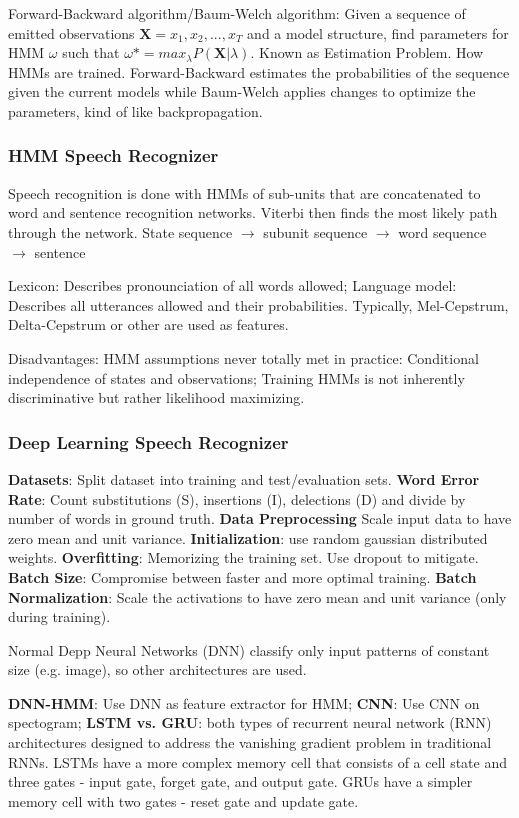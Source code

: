 Forward-Backward algorithm/Baum-Welch algorithm: Given a sequence of emitted observations $ \textbf{X} = x_1, x_2, ..., x_T $ and a model structure,
find parameters for HMM $ \omega $ such that $ \omega* = max_{\lambda} P(\textbf{X} | \lambda) $.
Known as Estimation Problem. How HMMs are trained.
Forward-Backward estimates the probabilities of the sequence given the current models while Baum-Welch applies changes to optimize the parameters,
kind of like backpropagation.

\subsubsection{HMM Speech Recognizer}
Speech recognition is done with HMMs of sub-units that are concatenated to word and sentence recognition networks.
Viterbi then finds the most likely path through the network.
State sequence $ \xrightarrow{} $ subunit sequence $ \xrightarrow{} $ word sequence $ \xrightarrow{} $ sentence

Lexicon: Describes pronounciation of all words allowed; Language model: Describes all utterances allowed and their probabilities.
Typically, Mel-Cepstrum, Delta-Cepstrum or other are used as features.

Disadvantages: HMM assumptions never totally met in practice: Conditional independence of states and observations;
Training HMMs is not inherently discriminative but rather likelihood maximizing.

\subsubsection{Deep Learning Speech Recognizer}
\textbf{Datasets}: Split dataset into training and test/evaluation sets.
\textbf{Word Error Rate}: Count substitutions (S), insertions (I), delections (D) and divide by number of words in ground truth.
\textbf{Data Preprocessing} Scale input data to have zero mean and unit variance.
\textbf{Initialization}: use random gaussian distributed weights.
\textbf{Overfitting}: Memorizing the training set. Use dropout to mitigate.
\textbf{Batch Size}: Compromise between faster and more optimal training.
\textbf{Batch Normalization}: Scale the activations to have zero mean and unit variance (only during training).

Normal Depp Neural Networks (DNN) classify only input patterns of constant size (e.g. image), so other architectures are used.

\textbf{DNN-HMM}: Use DNN as feature extractor for HMM; \textbf{CNN}: Use CNN on spectogram;
\textbf{LSTM vs. GRU}: both types of recurrent neural network (RNN) architectures designed to address the vanishing gradient problem in traditional RNNs.
LSTMs have a more complex memory cell that consists of a cell state and three gates - input gate, forget gate, and output gate.
GRUs have a simpler memory cell with two gates - reset gate and update gate.
